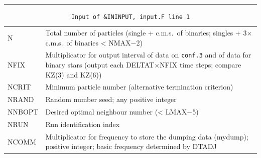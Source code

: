 \hrule
\noindent
\begin{longtable}{@{}p{1.5cm}p{13.0cm}}
\caption{\texttt{Input of \&ININPUT, input.F line 1}}
\label{table:ininput1}\\\hline
%
N       & Total number of particles (single + c.m.s.~of binaries;
          singles + 3$\times$c.m.s.~of binaries < NMAX$-$2)\\
NFIX    & Multiplicator for output interval of data on \texttt{conf.3} and
          of data for binary stars (output each DELTAT$\times$NFIX time steps; compare KZ(3) and KZ(6))\\
NCRIT   & Minimum particle number (alternative termination criterion) \\
NRAND   & Random number seed; any positive integer \\
NNBOPT  & Desired optimal neighbour number (< LMAX$-$5)\\ %
NRUN    & Run identification index\\
NCOMM   & Multiplicator for frequency to store the dumping data (mydump); positive integer; basic frequency determined by DTADJ \\
\end{longtable}

